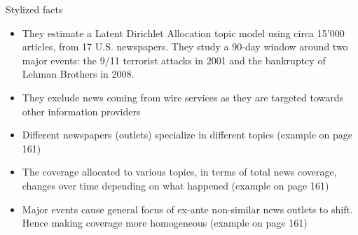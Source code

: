 Stylized facts
\begin{itemize}
    \item They estimate a Latent Dirichlet Allocation topic model using circa 15'000 articles, from 17 U.S. newspapers. They study a 90-day window around two major events: the 9/11 terrorist attacks in 2001 and the bankruptcy of Lehman Brothers in 2008.
    \item They exclude news coming from wire services as they are targeted towards other information providers
    \item Different newspapers (outlets) specialize in different topics (example on page 161)
    \item The coverage allocated to various topics, in terms of total news coverage, changes over time depending on what happened (example on page 161)
    \item Major events cause general focus of ex-ante non-similar news outlets to shift. Hence making coverage more homogeneous (example on page 161)
\end{itemize}


